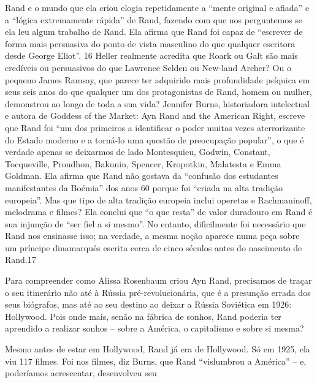 Rand e o mundo que ela criou elogia repetidamente a “mente original e afiada” e a “lógica extremamente rápida” de Rand, fazendo com que nos perguntemos se ela leu algum trabalho de Rand. Ela afirma que Rand foi capaz de “escrever de forma mais persuasiva do ponto de vista masculino do que qualquer escritora desde George Eliot”. {\color{blue}16} Heller realmente acredita que Roark ou Galt são mais credíveis ou persuasivos do que Lawrence Selden ou New-land Archer? Ou o pequeno James Ramsay, que parece ter adquirido mais profundidade psíquica em seus seis anos do que qualquer um dos protagonistas de Rand, homem ou mulher, demonstrou ao longo de toda a sua vida? Jennifer Burns, historiadora intelectual e autora de Goddess of the Market: Ayn Rand and the American Right, escreve que Rand foi “um dos primeiros a identificar o poder muitas vezes aterrorizante do Estado moderno e a torná-lo uma questão de preocupação popular”, o que é verdade apenas se deixarmos de lado Montesquieu, Godwin, Constant, Tocqueville, Proudhon, Bakunin, Spencer, Kropotkin, Malatesta e Emma Goldman. Ela afirma que Rand não gostava da “confusão dos estudantes manifestantes da Boémia” dos anos {\color{blue}60} porque foi “criada na alta tradição europeia”. Mas que tipo de alta tradição europeia inclui operetas e Rachmaninoff, melodrama e filmes? Ela conclui que “o que resta” de valor duradouro em Rand é sua injunção de “ser fiel a si mesmo”. No entanto, dificilmente foi necessário que Rand nos ensinasse isso; na verdade, a mesma noção aparece numa peça sobre um príncipe dinamarquês escrita cerca de cinco séculos antes do nascimento de Rand.{\color{blue}17}
 \par 
Para compreender como Alissa Rosenbaum criou Ayn Rand, precisamos de traçar o seu itinerário não até à Rússia pré-revolucionária, que é a presunção errada dos seus biógrafos, mas até ao seu destino ao deixar a Rússia Soviética em 1926: Hollywood. Pois onde mais, senão na fábrica de sonhos, Rand poderia ter aprendido a realizar sonhos – sobre a América, o capitalismo e sobre si mesma?
 \par 
Mesmo antes de estar em Hollywood, Rand já era de Hollywood. Só em 1925, ela viu {\color{blue}117} filmes. Foi nos filmes, diz Burns, que Rand “vislumbrou a América” – e, poderíamos acrescentar, desenvolveu seu
 \par 

